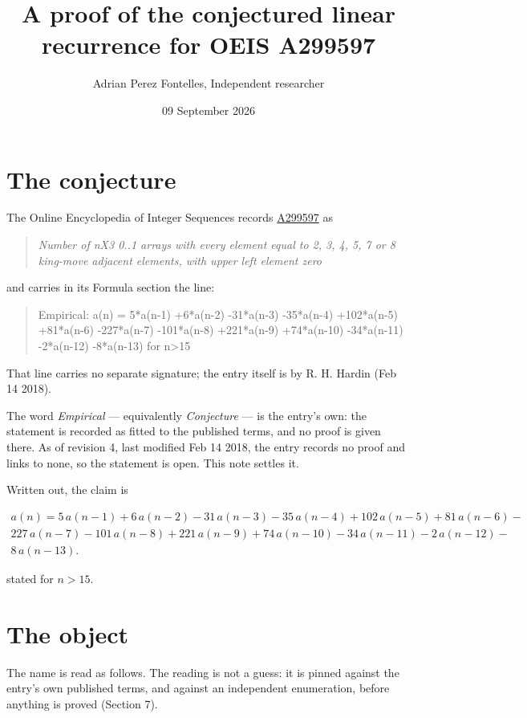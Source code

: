 \documentclass[11pt]{article}
\title{A proof of the conjectured linear recurrence for OEIS A299597}
\author{Adrian Perez Fontelles, Independent researcher}
\date{09 September 2026}
\theoremstyle{definition}
\begin{document}
\maketitle
\section{The conjecture}

The Online Encyclopedia of Integer Sequences records \href{https://oeis.org/A299597}{A299597} as

\begin{quote}\itshape Number of nX3 0..1 arrays with every element equal to 2, 3, 4, 5, 7 or 8 king-move adjacent elements, with upper left element zero\end{quote}

and carries in its Formula section the line:

\begin{quote}\ttfamily Empirical: a(n) = 5*a(n-1) +6*a(n-2) -31*a(n-3) -35*a(n-4) +102*a(n-5) +81*a(n-6) -227*a(n-7) -101*a(n-8) +221*a(n-9) +74*a(n-10) -34*a(n-11) -2*a(n-12) -8*a(n-13) for n>15\end{quote}

That line carries no separate signature; the entry itself is by R. H. Hardin (Feb 14 2018).

The word {\itshape Empirical} --- equivalently {\itshape Conjecture} --- is the entry's own: the statement is recorded as fitted to the published terms, and no proof is given there. As of revision 4, last modified Feb 14 2018, the entry records no proof and links to none, so the statement is open. This note settles it.

Written out, the claim is

\begin{multline*} a(n) = 5\,a(n-1) + 6\,a(n-2) - 31\,a(n-3) - 35\,a(n-4) + 102\,a(n-5) + 81\,a(n-6) - \\ 227\,a(n-7) - 101\,a(n-8) + 221\,a(n-9) + 74\,a(n-10) - 34\,a(n-11) - 2\,a(n-12) - \\ 8\,a(n-13). \end{multline*}

stated for $n > 15$.

\section{The object}

The name is read as follows. The reading is not a guess: it is pinned against the entry's own published terms, and against an independent enumeration, before anything is proved (Section 7).
\end{document}

